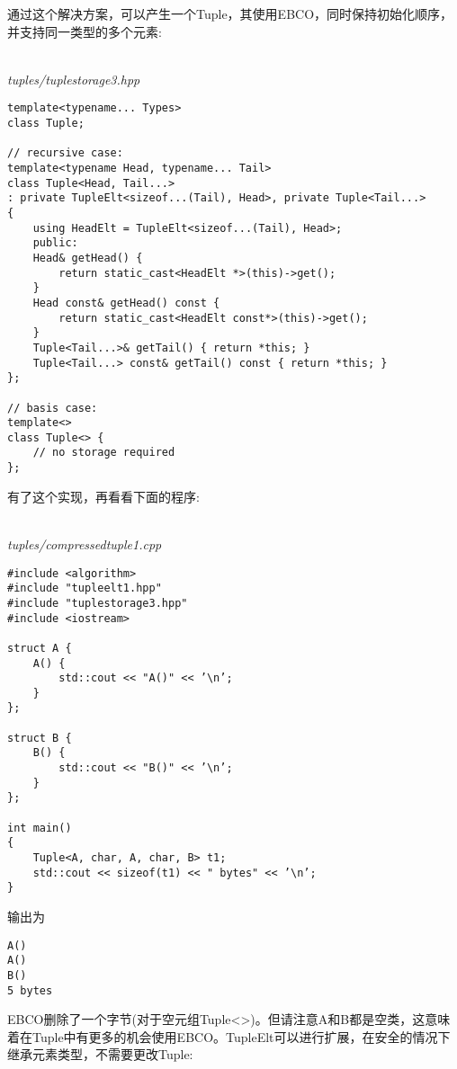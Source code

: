 通过这个解决方案，可以产生一个Tuple，其使用EBCO，同时保持初始化顺序，并支持同一类型的多个元素:

\hspace*{\fill} \\ %
\noindent
\textit{tuples/tuplestorage3.hpp}
\begin{lstlisting}[style=styleCXX]
template<typename... Types>
class Tuple;

// recursive case:
template<typename Head, typename... Tail>
class Tuple<Head, Tail...>
: private TupleElt<sizeof...(Tail), Head>, private Tuple<Tail...>
{
	using HeadElt = TupleElt<sizeof...(Tail), Head>;
	public:
	Head& getHead() {
		return static_cast<HeadElt *>(this)->get();
	}
	Head const& getHead() const {
		return static_cast<HeadElt const*>(this)->get();
	}
	Tuple<Tail...>& getTail() { return *this; }
	Tuple<Tail...> const& getTail() const { return *this; }
};

// basis case:
template<>
class Tuple<> {
	// no storage required
};
\end{lstlisting}

有了这个实现，再看看下面的程序:

\hspace*{\fill} \\ %
\noindent
\textit{tuples/compressedtuple1.cpp}
\begin{lstlisting}[style=styleCXX]
#include <algorithm>
#include "tupleelt1.hpp"
#include "tuplestorage3.hpp"
#include <iostream>

struct A {
	A() {
		std::cout << "A()" << ’\n’;
	}
};

struct B {
	B() {
		std::cout << "B()" << ’\n’;
	}
};

int main()
{
	Tuple<A, char, A, char, B> t1;
	std::cout << sizeof(t1) << " bytes" << ’\n’;
}
\end{lstlisting}

输出为

\begin{lstlisting}[style=styleCXX]
A()
A()
B()
5 bytes
\end{lstlisting}

EBCO删除了一个字节(对于空元组Tuple<>)。但请注意A和B都是空类，这意味着在Tuple中有更多的机会使用EBCO。TupleElt可以进行扩展，在安全的情况下继承元素类型，不需要更改Tuple:

